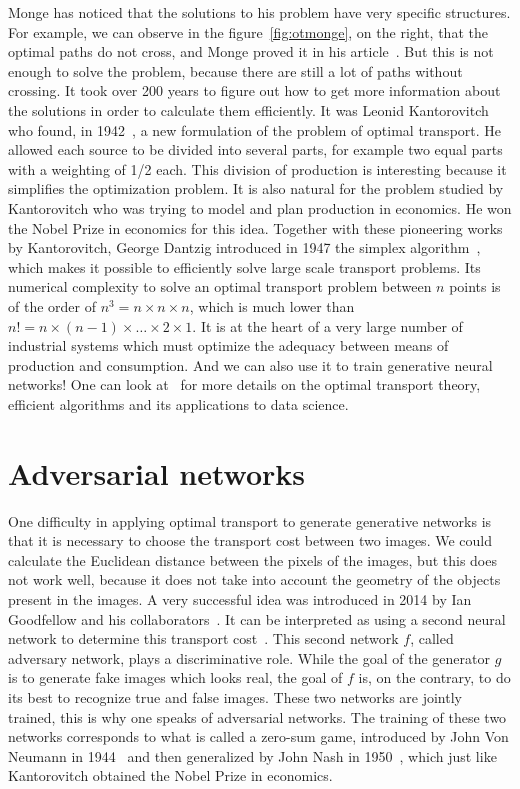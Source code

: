 Monge has noticed that the solutions to his problem have very specific structures. For example, we can observe in the figure~\ref{fig:otmonge}, on the right, that the optimal paths do not cross, and Monge proved it in his article~\cite{Monge1781}. But this is not enough to solve the problem, because there are still a lot of paths without crossing. It took over 200 years to figure out how to get more information about the solutions in order to calculate them efficiently.
%
It was Leonid Kantorovitch who found, in 1942~\cite{Kantorovich42}, a new formulation of the problem of optimal transport. He allowed each source to be divided into several parts, for example two equal parts with a weighting of 1/2 each. This division of production is interesting because it simplifies the optimization problem. It is also natural for the problem studied by Kantorovitch who was trying to model and plan production in economics. He won the Nobel Prize in economics for this idea.
%
Together with these pioneering works by Kantorovitch, George Dantzig introduced in 1947 the simplex algorithm~\cite{dantzig1990origins}, which makes it possible to efficiently solve large scale transport problems. Its numerical complexity to solve an optimal transport problem between $n$ points is of the order of $n^3 = n \times n \times n$, which is much lower than $n! = n  \times (n-1) \times \ldots \times 2 \times 1$. It is at the heart of a very large number of industrial systems which must optimize the adequacy between means of production and consumption. And we can also use it to train generative neural networks! One can look at~\cite{PeyreCuturi} for more details on the optimal transport theory, efficient algorithms and its applications to data science.


\section{Adversarial networks}

One difficulty in applying optimal transport to generate generative networks is that it is necessary to choose the transport cost between two images.
%
We could calculate the Euclidean distance between the pixels of the images, but this does not work well, because it does not take into account the geometry of the objects present in the images.
%
A very successful idea was introduced in 2014 by Ian Goodfellow and his collaborators~\cite{goodfellow2014generative}. It can be interpreted as using a second neural network to determine this transport cost~\cite{martin2017wasserstein}.
%
This second network $f$, called adversary network, plays a discriminative role. While the goal of the generator $g$ is to generate  fake images which looks real, the goal of $f$ is, on the contrary, to do its best to recognize true and false images. These two networks are jointly trained, this is why one speaks of adversarial networks.
%
The training of these two networks corresponds to what is called a zero-sum game, introduced by John Von Neumann in 1944~\cite{morgenstern1953theory} and then generalized by John Nash in 1950~\cite{nash1950equilibrium}, which just like Kantorovitch obtained the Nobel Prize in economics.

